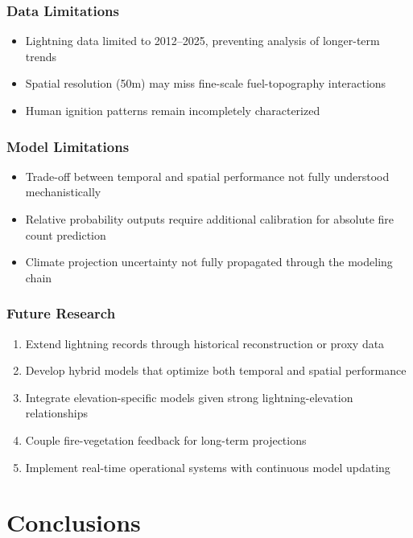 \documentclass[11pt,a4paper]{article}
\begin{document}
\subsubsection{Data Limitations}
\begin{itemize}
    \item Lightning data limited to 2012--2025, preventing analysis of longer-term trends
    \item Spatial resolution (50m) may miss fine-scale fuel-topography interactions
    \item Human ignition patterns remain incompletely characterized
\end{itemize}

\subsubsection{Model Limitations}
\begin{itemize}
    \item Trade-off between temporal and spatial performance not fully understood mechanistically
    \item Relative probability outputs require additional calibration for absolute fire count prediction
    \item Climate projection uncertainty not fully propagated through the modeling chain
\end{itemize}

\subsubsection{Future Research}
\begin{enumerate}
    \item Extend lightning records through historical reconstruction or proxy data
    \item Develop hybrid models that optimize both temporal and spatial performance
    \item Integrate elevation-specific models given strong lightning-elevation relationships
    \item Couple fire-vegetation feedback for long-term projections
    \item Implement real-time operational systems with continuous model updating
\end{enumerate}

\section{Conclusions}
\end{document}
